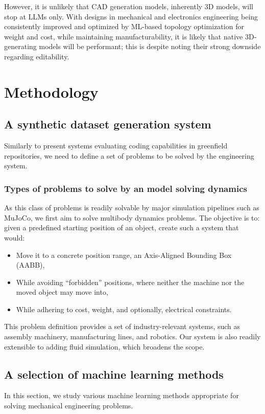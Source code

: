 \documentclass[conference]{IEEEtran}
\begin{document}
However, it is unlikely that CAD generation models, inherently 3D models, will stop at LLMs only. With designs in mechanical and electronics engineering being consistently improved and optimized by ML-based topology optimization \cite{ref11} for weight and cost, while maintaining manufacturability, it is likely that native 3D-generating models will be performant; this is despite noting their strong downside regarding editability.

\section{Methodology}

\subsection{A synthetic dataset generation system}
Similarly to present systems evaluating coding capabilities in greenfield repositories, we need to define a set of problems to be solved by the engineering system.

\subsubsection{Types of problems to solve by an model solving dynamics}
As this class of problems is readily solvable by major simulation pipelines such as MuJoCo, we first aim to solve multibody dynamics problems. The objective is to: given a predefined starting position of an object, create such a system that would:

\begin{itemize}
    \item Move it to a concrete position range, an Axis-Aligned Bounding Box (AABB),
    \item While avoiding ``forbidden'' positions, where neither the machine nor the moved object may move into,
    \item While adhering to cost, weight, and optionally, electrical constraints.
\end{itemize}

This problem definition provides a set of industry-relevant systems, such as assembly machinery, manufacturing lines, and robotics. Our system is also readily extensible to adding fluid simulation, which broadens the scope.

\subsection{A selection of machine learning methods}
In this section, we study various machine learning methods appropriate for solving mechanical engineering problems.
\end{document}

